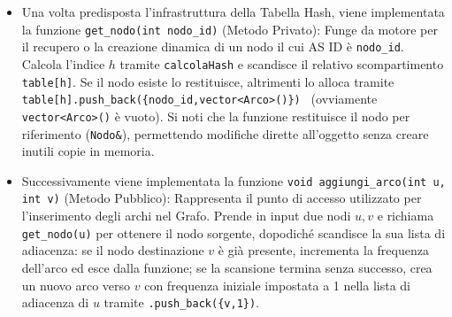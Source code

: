 \documentclass[12pt, a4paper]{article}
\begin{document}
\begin{enumerate}
\begin{itemize}
        Nel \texttt{private} vengono inseriti:
        \begin{itemize}
            \item[*] La dimensione $m$ della Tabella Hash. 
            \item[*] Un \texttt{vector<vector<Nodo>>} \texttt{table} che rappresenta la memoria della Tabella Hash. Il vettore esterno modella gli $m$ scompartimenti, mentre quello interno implementa le liste di concatenazione per risolvere le collisioni.
            \item[*] L'Oggetto delegato \texttt{hasher} della classe \texttt{UniversalHash}. La classe Grafo non esegue calcoli matematici complessi al proprio interno, ma li "delega" al motore \texttt{hasher}.
            \item[*] La funzione \texttt{calcolaHash(int x)} per calcolare l'indice $h$ di un nodo $x$. Questa prende il risultato di $h(x)$ della classe \texttt{UniversalHash}, vi applica l'operatore modulo $m$, corregge gli eventuali risultati negativi sommando $m$ ad $h$ e ritorna l'indice $h$ definitivo. Questa operazione è la funzione di hash universale.
        \end{itemize}   
        Nel \texttt{public} la struttura principale è il \texttt{Costruttore}, che alloca preventivamente la dimensione totale $m$ della Tabella Hash e avvia la creazione dell'oggetto \texttt{UniversalHash}, passandogli il numero primo fisso $p = 998244353$ (scelto appositamente molto grande per minimizzare le collisioni).
        \item[-] Una volta predisposta l'infrastruttura della Tabella Hash, viene implementata la funzione \texttt{get\_nodo(int nodo\_id)} (Metodo Privato): Funge da motore per il recupero o la creazione dinamica di un nodo il cui AS ID è \texttt{nodo\_id}. Calcola l'indice $h$ tramite \texttt{calcolaHash} e scandisce il relativo scompartimento \texttt{table[h]}. Se il nodo esiste lo restituisce, altrimenti lo alloca tramite \texttt{table[h].push\_back(\{nodo\_id,vector<Arco>()\}) } (ovviamente \texttt{vector<Arco>()} è vuoto). Si noti che la funzione restituisce il nodo per riferimento (\texttt{Nodo\&}), permettendo modifiche dirette all'oggetto senza creare inutili copie in memoria.
        \item[-] Successivamente viene implementata la funzione \texttt{void aggiungi\_arco(int u, int v)} (Metodo Pubblico): Rappresenta il punto di accesso utilizzato per l'inserimento degli archi nel Grafo. Prende in input due nodi $u,v$ e richiama \texttt{get\_nodo(u)} per ottenere il nodo sorgente, dopodiché scandisce la sua lista di adiacenza: se il nodo destinazione $v$ è già presente, incrementa la frequenza dell'arco ed esce dalla funzione; se la scansione termina senza successo, crea un nuovo arco verso $v$ con frequenza iniziale impostata a 1 nella lista di adiacenza di $u$ tramite \texttt{.push\_back(\{v,1\})}. \\

\end{itemize}
\end{enumerate}
\end{document}
